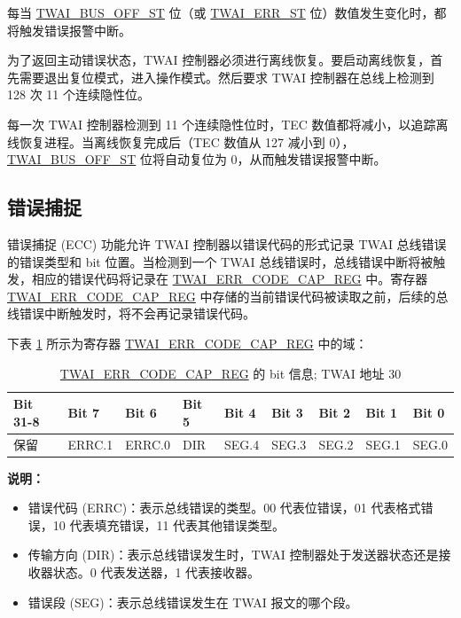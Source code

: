 \documentclass[main\_\_CN.tex]{subfiles}
\begin{document}
每当 \hyperref[fielddesc:TWAIBUSOFFST]{TWAI\_BUS\_OFF\_ST} 位（或 \hyperref[fielddesc:TWAIERRST]{TWAI\_ERR\_ST} 位）数值发生变化时，都将触发错误报警中断。

为了返回主动错误状态，TWAI 控制器必须进行离线恢复。要启动离线恢复，首先需要退出复位模式，进入操作模式。然后要求 TWAI 控制器在总线上检测到 128 次 11 个连续隐性位。

每一次 TWAI 控制器检测到 11 个连续隐性位时，TEC 数值都将减小，以追踪离线恢复进程。当离线恢复完成后（TEC 数值从 127 减小到 0），\hyperref[fielddesc:TWAIBUSOFFST]{TWAI\_BUS\_OFF\_ST} 位将自动复位为 0，从而触发错误报警中断。

\subsection{错误捕捉}

错误捕捉 (ECC) 功能允许 TWAI 控制器以错误代码的形式记录 TWAI 总线错误的错误类型和 bit 位置。当检测到一个 TWAI 总线错误时，总线错误中断将被触发，相应的错误代码将记录在 \hyperref[regdesc:TWAIERRCODECAPREG]{TWAI\_ERR\_CODE\_CAP\_REG} 中。寄存器 \hyperref[regdesc:TWAIERRCODECAPREG]{TWAI\_ERR\_CODE\_CAP\_REG} 中存储的当前错误代码被读取之前，后续的总线错误中断触发时，将不会再记录错误代码。

下表 \ref{table:ECC_REG1} 所示为寄存器 \hyperref[regdesc:TWAIERRCODECAPREG]{TWAI\_ERR\_CODE\_CAP\_REG} 中的域：

\begin{longtable}[c]{|p{1.4cm}|p{1.4cm}|p{1.4cm}|p{1.4cm}|p{1.4cm}|p{1.4cm}|p{1.4cm}|p{1.4cm}|p{1.4cm}|}
    \caption{\hyperref[regdesc:TWAIERRCODECAPREG]{TWAI\_ERR\_CODE\_CAP\_REG} 的 bit 信息; TWAI 地址 \hexprefix{}30}
    \label{table:ECC_REG1}\\
    \hline
    \rowcolor{lightgray}
    Bit 31-8 & Bit 7 & Bit 6 & Bit 5 & Bit 4 & Bit 3 & Bit 2 & Bit 1 & Bit 0\\\hline
    保留 & ERRC.1 & ERRC.0 & DIR & SEG.4 & SEG.3 & SEG.2 & SEG.1 & SEG.0\\
    \hline
\end{longtable}
\vspace{-1.5em}
{\bfseries 说明：}\\
\begin{itemize}
    \item 错误代码 (ERRC)：表示总线错误的类型。00 代表位错误，01 代表格式错误，10 代表填充错误，11 代表其他错误类型。
    \item 传输方向 (DIR)：表示总线错误发生时，TWAI 控制器处于发送器状态还是接收器状态。0 代表发送器，1 代表接收器。
    \item 错误段 (SEG)：表示总线错误发生在 TWAI 报文的哪个段。
\end{itemize}
\end{document}
